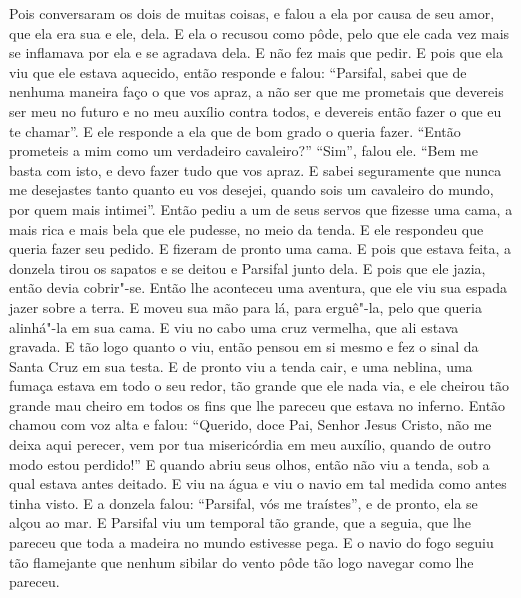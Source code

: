 Pois conversaram os dois de muitas coisas, e falou a ela por causa de seu
amor, que ela era sua e ele, dela. E ela o recusou como pôde, pelo que ele cada
vez mais se inflamava por ela e se agradava dela. E não fez mais que pedir. E
pois que ela viu que ele estava aquecido, então responde e falou: “Parsifal,
sabei que de nenhuma maneira faço o que vos apraz, a não ser que me prometais
que devereis ser meu no futuro e no meu auxílio contra todos, e devereis então
fazer o que eu te chamar”. E ele responde a ela que de bom grado o queria
fazer. “Então prometeis a mim como um verdadeiro cavaleiro?” “Sim”, falou ele.
“Bem me basta com isto, e devo fazer tudo que vos apraz. E sabei seguramente
que nunca me desejastes tanto quanto eu vos desejei, quando sois um cavaleiro
do mundo, por quem mais intimei”. Então pediu a um de seus servos que fizesse
uma cama, a mais rica e mais bela que ele pudesse, no meio da tenda. E ele
respondeu que queria fazer seu pedido. E fizeram de pronto uma cama. E pois que
estava feita, a donzela tirou os sapatos e se deitou e Parsifal junto dela. E
pois que ele jazia, então devia cobrir"-se. Então lhe aconteceu uma aventura,
que ele viu sua espada jazer sobre a terra. E moveu sua mão para lá, para
erguê"-la, pelo que queria alinhá"-la em sua cama. E viu no cabo uma cruz
vermelha, que ali estava gravada. E tão logo quanto o viu, então pensou em si
mesmo e fez o sinal da Santa Cruz em sua testa. E de pronto viu a tenda cair, e
uma neblina, uma fumaça estava em todo o seu redor, tão grande que ele nada
via, e ele cheirou tão grande mau cheiro em todos os fins que lhe pareceu que
estava no inferno. Então chamou com voz alta e falou: “Querido, doce Pai,
Senhor Jesus Cristo, não me deixa aqui perecer, vem por tua misericórdia em meu
auxílio, quando de outro modo estou perdido!” E quando abriu seus olhos, então
não viu a tenda, sob a qual estava antes deitado. E viu na água e viu o navio
em tal medida como antes tinha visto. E a donzela falou: “Parsifal, vós me
traístes”, e de pronto, ela se alçou ao mar. E Parsifal viu um temporal tão
grande, que a seguia, que lhe pareceu que toda a madeira no mundo estivesse
pega. E o navio do fogo seguiu tão flamejante que nenhum sibilar do vento pôde
tão logo navegar como lhe pareceu. 

